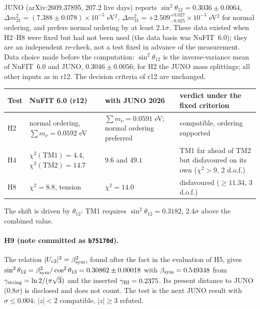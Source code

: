JUNO (arXiv:2609.37895, 207.2 live days) reports \(\sin^2\theta_{12}=0.3036\pm0.0064\),
\(\Delta m^2_{21}=(7.388\pm0.078)\times10^{-5}\) eV\(^2\), \(\Delta m^2_{31}=+2.509^{+0.027}_{-0.025}\times10^{-3}\)
eV\(^2\) for normal ordering, and prefers normal ordering by at least \(2.1\sigma\).  These data existed when H2--H8
were fixed but had not been used (the data basis was NuFIT~6.0); they are an independent re-check, not a test
fixed in advance of the measurement.  Data choice made before the computation: \(\sin^2\theta_{12}\) is the
inverse-variance mean of NuFIT~6.0 and JUNO, \(0.3046\pm0.0056\); for H2 the JUNO mass splittings; all other
inputs as in r12.  The decision criteria of r12 are unchanged.
\begin{center}
\small
\begin{tabular}{>{\raggedright\arraybackslash}p{}>{\raggedright\arraybackslash}p{}>{\raggedright\arraybackslash}p{}>{\raggedright\arraybackslash}p{}}
\toprule
Test & NuFIT 6.0 (r12) & with JUNO 2026 & verdict under the fixed criterion\\
\midrule
H2 & normal ordering, \(\sum m_\nu=0.0592\) eV & \(\sum m_\nu=0.0591\) eV; normal ordering preferred & compatible, ordering supported\\
H4 & \(\chi^2(\mathrm{TM1})=4.4\), \(\chi^2(\mathrm{TM2})=14.7\) & \(9.6\) and \(49.1\) & TM1 far ahead of TM2 but disfavoured on its own (\(\chi^2>9\), 2 d.o.f.)\\
H8 & \(\chi^2=8.8\), tension & \(\chi^2=14.0\) & disfavoured (\(\ge11.34\), 3 d.o.f.)\\
\bottomrule
\end{tabular}
\end{center}
The shift is driven by \(\theta_{12}\): TM1 requires \(\sin^2\theta_{12}=0.3182\), \(2.4\sigma\) above the combined
value.

\paragraph{H9 (note committed as \texttt{b75170d}).}
The relation \(|U_{e2}|^2=\beta_{\rm sym}^2\), found after the fact in the evaluation of H5, gives
\(\sin^2\theta_{12}=\beta_{\rm sym}^2/\cos^2\theta_{13}=0.30862\pm0.00018\) with
\(\beta_{\rm sym}=0.549348\) from \(\gamma_{\rm string}=\ln2/(\pi\sqrt3)\) and the inserted
\(\gamma_{\rm BI}=0.2375\).  Its present distance to JUNO (\(0.8\sigma\)) is disclosed and does not count.  The
test is the next JUNO result with \(\sigma\le0.004\): \(|z|<2\) compatible, \(|z|\ge3\) refuted.

